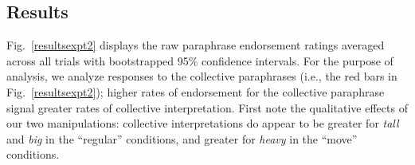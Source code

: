 \documentclass[preprint,12pt,authoryear,titlepage]{elsarticle}
\newcommand{\ndg}[1]{\textcolor{Green}{[ndg: #1]}}
\begin{document}
%
%
%

\subsection{Results}

Fig.\ \ref{resultsexpt2} displays the raw paraphrase endorsement ratings averaged across all trials with bootstrapped 95\% confidence intervals. For the purpose of analysis, we analyze responses to the collective paraphrases (i.e., the red bars in Fig.~\ref{resultsexpt2}); higher rates of endorsement for the collective paraphrase signal greater rates of collective interpretation. %
First note the qualitative effects of our two manipulations: collective interpretations do appear to be greater for \emph{tall} and \emph{big} in the ``regular'' conditions, and greater for \emph{heavy} in the ``move'' conditions.
\end{document}
